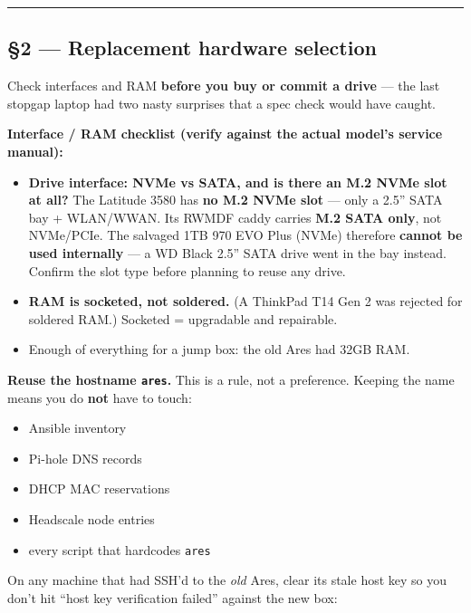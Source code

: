 \documentclass[
]{article}
\providecommand{\tightlist}{%
  \setlength{\itemsep}{0pt}\setlength{\parskip}{0pt}}
\begin{document}
\begin{center}\rule{0.5\linewidth}{0.5pt}\end{center}

\hypertarget{replacement-hardware-selection}{%
\subsection{§2 --- Replacement hardware
selection}\label{replacement-hardware-selection}}

Check interfaces and RAM \textbf{before you buy or commit a drive} ---
the last stopgap laptop had two nasty surprises that a spec check would
have caught.

\textbf{Interface / RAM checklist (verify against the actual model's
service manual):}

\begin{itemize}
\tightlist
\item[$\square$]
  \textbf{Drive interface: NVMe vs SATA, and is there an M.2 NVMe slot
  at all?} The Latitude 3580 has \textbf{no M.2 NVMe slot} --- only a
  2.5'' SATA bay + WLAN/WWAN. Its RWMDF caddy carries \textbf{M.2 SATA
  only}, not NVMe/PCIe. The salvaged 1TB 970 EVO Plus (NVMe) therefore
  \textbf{cannot be used internally} --- a WD Black 2.5'' SATA drive
  went in the bay instead. Confirm the slot type before planning to
  reuse any drive.
\item[$\square$]
  \textbf{RAM is socketed, not soldered.} (A ThinkPad T14 Gen 2 was
  rejected for soldered RAM.) Socketed = upgradable and repairable.
\item[$\square$]
  Enough of everything for a jump box: the old Ares had 32GB RAM.
\end{itemize}

\textbf{Reuse the hostname \texttt{ares}.} This is a rule, not a
preference. Keeping the name means you do \textbf{not} have to touch:

\begin{itemize}
\tightlist
\item
  Ansible inventory
\item
  Pi-hole DNS records
\item
  DHCP MAC reservations
\item
  Headscale node entries
\item
  every script that hardcodes \texttt{ares}
\end{itemize}

On any machine that had SSH'd to the \emph{old} Ares, clear its stale
host key so you don't hit ``host key verification failed'' against the
new box:
\end{document}
